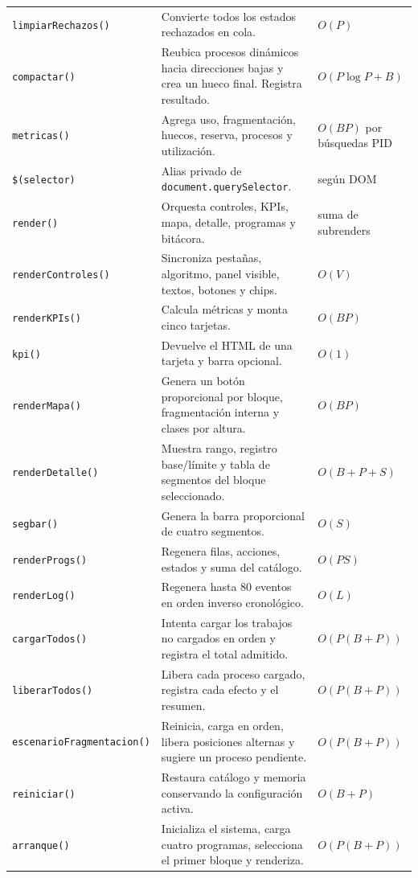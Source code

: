 \documentclass[11pt,a4paper]{article}
\newcommand{\funcion}[1]{\texttt{#1()}}
\begin{document}
\begin{longtable}{p{}p{}p{}}
\funcion{limpiarRechazos} & Convierte todos los estados rechazados en cola. & \(O(P)\)\\
\funcion{compactar} & Reubica procesos dinámicos hacia direcciones bajas y crea un hueco final. Registra resultado. & \(O(P\log P+B)\)\\
\funcion{metricas} & Agrega uso, fragmentación, huecos, reserva, procesos y utilización. & \(O(BP)\) por búsquedas PID\\
\texttt{\$(selector)} & Alias privado de \texttt{document.querySelector}. & según DOM\\
\funcion{render} & Orquesta controles, KPIs, mapa, detalle, programas y bitácora. & suma de subrenders\\
\funcion{renderControles} & Sincroniza pestañas, algoritmo, panel visible, textos, botones y chips. & \(O(V)\)\\
\funcion{renderKPIs} & Calcula métricas y monta cinco tarjetas. & \(O(BP)\)\\
\funcion{kpi} & Devuelve el HTML de una tarjeta y barra opcional. & \(O(1)\)\\
\funcion{renderMapa} & Genera un botón proporcional por bloque, fragmentación interna y clases por altura. & \(O(BP)\)\\
\funcion{renderDetalle} & Muestra rango, registro base/límite y tabla de segmentos del bloque seleccionado. & \(O(B+P+S)\)\\
\funcion{segbar} & Genera la barra proporcional de cuatro segmentos. & \(O(S)\)\\
\funcion{renderProgs} & Regenera filas, acciones, estados y suma del catálogo. & \(O(PS)\)\\
\funcion{renderLog} & Regenera hasta 80 eventos en orden inverso cronológico. & \(O(L)\)\\
\funcion{cargarTodos} & Intenta cargar los trabajos no cargados en orden y registra el total admitido. & \(O(P(B+P))\)\\
\funcion{liberarTodos} & Libera cada proceso cargado, registra cada efecto y el resumen. & \(O(P(B+P))\)\\
\texttt{escenario}\newline\texttt{Fragmentacion()} & Reinicia, carga en orden, libera posiciones alternas y sugiere un proceso pendiente. & \(O(P(B+P))\)\\
\funcion{reiniciar} & Restaura catálogo y memoria conservando la configuración activa. & \(O(B+P)\)\\
\funcion{arranque} & Inicializa el sistema, carga cuatro programas, selecciona el primer bloque y renderiza. & \(O(P(B+P))\)\\
\bottomrule
\end{longtable}
\end{document}
